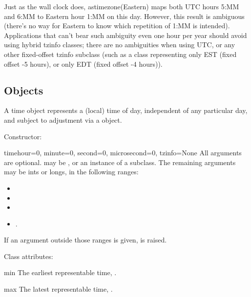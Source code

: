 Just as the wall clock does, astimezone(Eastern) maps both UTC hours 5:MM
and 6:MM to Eastern hour 1:MM on this day.  However, this result is
ambiguous (there's no way for Eastern to know which repetition of 1:MM
is intended).  Applications that can't bear such ambiguity even one hour
per year should avoid using hybrid tzinfo classes; there are no
ambiguities when using UTC, or any other fixed-offset tzinfo subclass
(such as a class representing only EST (fixed offset -5 hours), or only
EDT (fixed offset -4 hours)).


\subsection{ Objects \label{datetime-timetz}}

A time object represents a (local) time of day, independent of any
particular day, and subject to adjustment via a  object.

Constructor:

\begin{classdesc}{time}{hour=0, minute=0, second=0, microsecond=0,
                        tzinfo=None}
  All arguments are optional.   may be , or
  an instance of a  subclass.  The remaining arguments
  may be ints or longs, in the following ranges:

  \begin{itemize}
    \item {}
    \item {}
    \item {}
    \item {}.
  \end{itemize}

  If an argument outside those ranges is given,
   is raised.
\end{classdesc}

Class attributes:

\begin{memberdesc}{min}
  The earliest representable time, .
\end{memberdesc}

\begin{memberdesc}{max}
  The latest representable time, .
\end{memberdesc}

